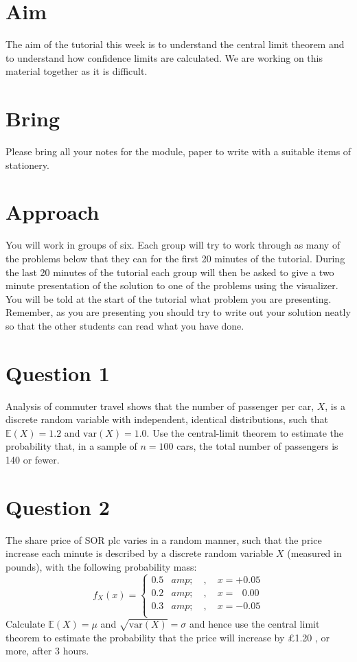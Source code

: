 \documentclass[a4paper]{article}
\begin{document}
\section{Aim}

The aim of the tutorial this week is to understand the central limit theorem and to understand how confidence limits are calculated.  We are working on this material together as it is difficult.

\section{Bring}

Please bring all your notes for the module, paper to write with a suitable items of stationery.

\section{Approach}

You will work in groups of six.  Each group will try to work through as many of the problems below that they can for the first 20 minutes of the tutorial.  During the last 20 minutes of the tutorial 
each group will then be asked to give a two minute presentation of the solution to one of the problems using the visualizer.  You will be told at the start of the tutorial what problem you are 
presenting.  Remember, as you are presenting you should try to write out your solution neatly so that the other students can read what you have done.

\section{Question 1}

Analysis of commuter travel  shows that the number of passenger per car, $X$,
is a discrete random variable with independent, identical distributions, such that
$\mathbb{E}(X)=1.2$ and $\textrm{var}(X) = 1.0$.  Use the central-limit theorem  to estimate
the probability that, in a sample of $n=100$ cars, the total number of passengers is 140 or fewer.


\section{Question 2}

The share price of SOR plc  varies in  a random manner, such that
the price increase each minute is described by a discrete
random variable  $X$ (measured in pounds), with the following probability mass:
$$
f_{X}(x) =
\left\{
\begin{array}{ll}
0.5   &amp; \quad , \quad  x=+0.05  \\
0.2  &amp; \quad , \quad x=\ \ \ 0.00  \\
0.3   &amp; \quad , \quad  x=-0.05  \\
\end{array}
\right.
$$
Calculate $\mathbb{E}(X)=\mu$ and $\sqrt{\textrm{var}(X)}=\sigma$ and hence use the central limit
theorem to estimate the probability  that the price will increase by £1.20 , or more,  after 3  hours.
\end{document}
